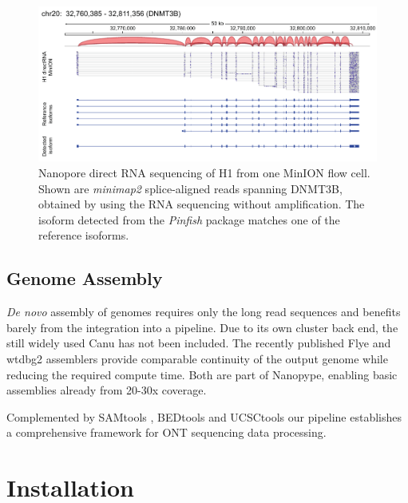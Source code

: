 \begin{figure}[h]
	\centering
	\includegraphics[width=1.0\textwidth]{figures/nanopype/rna_isoforms.pdf}
	\captionsetup{format=plain}
	\caption[Nanopore direct RNA sequencing]{Nanopore direct RNA sequencing of H1 from one MinION flow cell. Shown are \textit{minimap2} splice-aligned reads spanning DNMT3B, obtained by using the RNA sequencing without amplification. The isoform detected from the \textit{Pinfish} package matches one of the reference isoforms.}
	\label{fig:nanopype:rna_isoforms}
\end{figure}


\subsection{Genome Assembly}
\label{subsec:nanopype:assembly}

\textit{De novo} assembly of genomes requires only the long read sequences and benefits barely from the integration into a pipeline. Due to its own cluster back end, the still widely used Canu \cite{Koren2017} has not been included. The recently published Flye \cite{Kolmogorov2019} and wtdbg2 \cite{Ruan2020} assemblers provide comparable continuity of the output genome while reducing the required compute time. Both are part of Nanopype, enabling basic assemblies already from 20-30x coverage.

Complemented by SAMtools \cite{Li2009}, BEDtools \cite{Quinlan2010} and UCSCtools \cite{Kent2010} our pipeline establishes a comprehensive framework for ONT sequencing data processing.




\section{Installation}
\label{sec:nanopype:installation}

